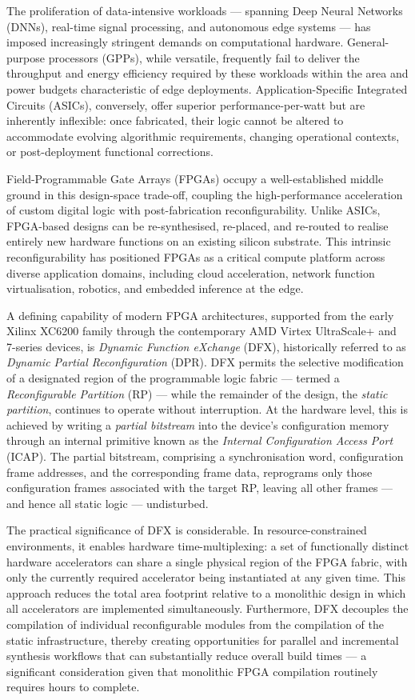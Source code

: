 The proliferation of data-intensive workloads — spanning Deep Neural Networks (DNNs), real-time signal processing, and autonomous edge systems — has imposed increasingly stringent demands on computational hardware. General-purpose processors (GPPs), while versatile, frequently fail to deliver the throughput and energy efficiency required by these workloads within the area and power budgets characteristic of edge deployments. Application-Specific Integrated Circuits (ASICs), conversely, offer superior performance-per-watt but are inherently inflexible: once fabricated, their logic cannot be altered to accommodate evolving algorithmic requirements, changing operational contexts, or post-deployment functional corrections.

Field-Programmable Gate Arrays (FPGAs) occupy a well-established middle ground in this design-space trade-off, coupling the high-performance acceleration of custom digital logic with post-fabrication reconfigurability. Unlike ASICs, FPGA-based designs can be re-synthesised, re-placed, and re-routed to realise entirely new hardware functions on an existing silicon substrate. This intrinsic reconfigurability has positioned FPGAs as a critical compute platform across diverse application domains, including cloud acceleration, network function virtualisation, robotics, and embedded inference at the edge.

A defining capability of modern FPGA architectures, supported from the early Xilinx XC6200 family through the contemporary AMD Virtex UltraScale+ and 7-series devices, is \textit{Dynamic Function eXchange} (DFX), historically referred to as \textit{Dynamic Partial Reconfiguration} (DPR). DFX permits the selective modification of a designated region of the programmable logic fabric — termed a \textit{Reconfigurable Partition} (RP) — while the remainder of the design, the \textit{static partition}, continues to operate without interruption. At the hardware level, this is achieved by writing a \textit{partial bitstream} into the device's configuration memory through an internal primitive known as the \textit{Internal Configuration Access Port} (ICAP). The partial bitstream, comprising a synchronisation word, configuration frame addresses, and the corresponding frame data, reprograms only those configuration frames associated with the target RP, leaving all other frames — and hence all static logic — undisturbed.

The practical significance of DFX is considerable. In resource-constrained environments, it enables hardware time-multiplexing: a set of functionally distinct hardware accelerators can share a single physical region of the FPGA fabric, with only the currently required accelerator being instantiated at any given time. This approach reduces the total area footprint relative to a monolithic design in which all accelerators are implemented simultaneously. Furthermore, DFX decouples the compilation of individual reconfigurable modules from the compilation of the static infrastructure, thereby creating opportunities for parallel and incremental synthesis workflows that can substantially reduce overall build times — a significant consideration given that monolithic FPGA compilation routinely requires hours to complete.

